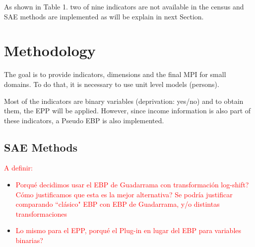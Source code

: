 \documentclass[a4paper, 11pt]{article}
\begin{document}

As shown in Table 1. two of nine indicators are not available in the census and SAE methods are implemented as will be explain in next Section. 

\section{Methodology}



    The goal is to provide indicators, dimensions and the final MPI for small domains. To do that, it is necessary to use unit level models (persons).
    
    Most of the indicators are binary variables (deprivation: yes/no) and to obtain them, the EPP will be applied. However, since income information is also part of these indicators, a Pseudo EBP is also implemented. 
    
\subsection{SAE Methods}

\textcolor{red}{A definir: }
\begin{itemize}
\item \textcolor{red}{Porqué decidimos usar el EBP de Guadarrama con transformación log-shift? Cómo justificamos que esta es la mejor alternativa? Se podría justificar comparando ``clásico" EBP con EBP de Guadarrama, y/o distintas transformaciones }
\item \textcolor{red}{Lo mismo para el EPP, porqué el Plug-in en lugar del EBP para variables binarias?}
\end{itemize}
\end{document}
